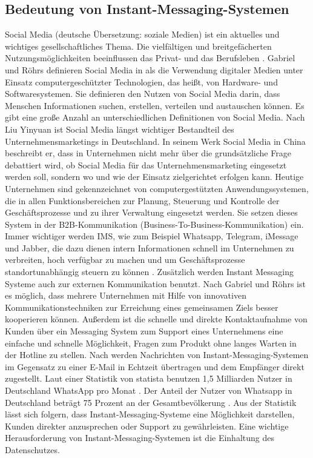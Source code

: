 \documentclass[a4paper,titlepage,halfparskip,12pt]{scrreprt}
\begin{document}
\begin{onehalfspacing}

\pagestyle{fancyheadlines}

\chapter{Bedeutung von Instant-Messaging-Systemen}
\label{chap:Einleitung}

Social Media (deutsche Übersetzung: \glqq soziale Medien\grqq{}) ist ein aktuelles und wichtiges gesellschaftliches Thema. Die vielfältigen und breitgefächerten Nutzungsmöglichkeiten beeinflussen das Privat- und das Berufsleben \cite{gabriel2017social}. Gabriel und Röhrs definieren Social Media in \cite{gabriel2017social} als die Verwendung digitaler Medien unter Einsatz computergeschützter Technologien, das heißt, von Hardware- und Softwaresystemen. Sie definieren den Nutzen von Social Media darin, dass Menschen Informationen suchen, erstellen, verteilen und austauschen können. Es gibt eine große Anzahl an unterschiedlichen Definitionen von Social Media. Nach Liu Yinyuan ist Social Media längst wichtiger Bestandteil des Unternehmensmarketings in Deutschland. In seinem Werk \glqq Social Media in China\grqq{} \cite{liu2016social} beschreibt er, dass in Unternehmen nicht mehr über die grundsätzliche Frage debattiert wird, ob Social Media für das Unternehmensmarketing eingesetzt werden soll, sondern wo und wie der Einsatz zielgerichtet erfolgen kann. Heutige Unternehmen sind gekennzeichnet von computergestützten Anwendungssystemen, die in allen Funktionsbereichen zur Planung, Steuerung und Kontrolle der Geschäftsprozesse und zu ihrer Verwaltung eingesetzt werden. Sie setzen dieses System in der B2B-Kommunikation (Business-To-Business-Kommunikation) ein. Immer wichtiger werden \ac{IMS}, wie zum Beispiel Whatsapp, Telegram, iMessage und Jabber, die dazu dienen intern Informationen schnell im Unternehmen zu verbreiten, hoch verfügbar zu machen und um Geschäftsprozesse standortunabhängig steuern zu können \cite{gabriel2017social}. Zusätzlich werden Instant Messaging Systeme auch zur externen Kommunikation benutzt. Nach Gabriel und Röhrs ist es möglich, dass mehrere Unternehmen mit Hilfe von innovativen Kommunikationstechniken zur Erreichung eines gemeinsamen Ziels besser kooperieren können. Außerdem ist die schnelle und direkte Kontaktaufnahme von Kunden über ein Messaging System zum Support eines Unternehmens eine einfache und schnelle Möglichkeit, Fragen zum Produkt ohne langes Warten in der Hotline zu stellen. Nach \cite{b2bmehner} werden Nachrichten von Instant-Messaging-Systemen im Gegensatz zu einer E-Mail in Echtzeit übertragen und dem Empfänger direkt zugestellt. Laut einer Statistik von statista benutzen 1,5 Milliarden Nutzer in Deutschland WhatsApp pro Monat \cite{statistaIMS}. Der Anteil der Nutzer von Whatsapp in Deutschland beträgt 75 Prozent an der Gesamtbevölkerung \cite{statistaIMS}. Aus der Statistik  lässt sich folgern, dass Instant-Messaging-Systeme eine Möglichkeit darstellen, Kunden direkter anzusprechen oder Support zu gewährleisten. Eine wichtige Herausforderung von Instant-Messaging-Systemen ist die Einhaltung des Datenschutzes.


\end{onehalfspacing}
\end{document}
